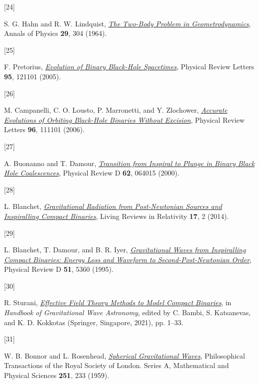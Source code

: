 \documentclass[
  11pt,
  a4paper,
  DIV=11,
  numbers=noendperiod,
  twoside]{scrreprt}
\newlength{\cslhangindent}
\newlength{\csllabelwidth}
\newlength{\cslentryspacingunit} %
\newenvironment{CSLReferences}[2] %
 {%
  \setlength{\parindent}{0pt}
  \ifodd #1
  \let\oldpar\par
  \def\par{\hangindent=\cslhangindent\oldpar}
  \fi
  \setlength{\parskip}{#2\cslentryspacingunit}
 }%
 {}
\newcommand{\CSLLeftMargin}[1]{\parbox[t]{\csllabelwidth}{#1}}
\newcommand{\CSLRightInline}[1]{\parbox[t]{\linewidth - \csllabelwidth}{#1}\break}
\DeclareRobustCommand{\[}{\begin{equation}}
\DeclareRobustCommand{\]}{\end{equation}}
\begin{document}
\begin{CSLReferences}{0}{0}
\leavevmode{}%
\CSLLeftMargin{{[}24{]} }%
\CSLRightInline{S. G. Hahn and R. W. Lindquist,
\emph{\href{https://doi.org/10.1016/0003-4916(64)90223-4}{The Two-Body
Problem in Geometrodynamics}}, Annals of Physics \textbf{29}, 304
(1964).}

\leavevmode{}%
\CSLLeftMargin{{[}25{]} }%
\CSLRightInline{F. Pretorius,
\emph{\href{https://doi.org/10.1103/PhysRevLett.95.121101}{Evolution of
{Binary Black-Hole Spacetimes}}}, Physical Review Letters \textbf{95},
121101 (2005).}

\leavevmode{}%
\CSLLeftMargin{{[}26{]} }%
\CSLRightInline{M. Campanelli, C. O. Lousto, P. Marronetti, and Y.
Zlochower,
\emph{\href{https://doi.org/10.1103/PhysRevLett.96.111101}{Accurate
{Evolutions} of {Orbiting Black-Hole Binaries} Without {Excision}}},
Physical Review Letters \textbf{96}, 111101 (2006).}

\leavevmode{}%
\CSLLeftMargin{{[}27{]} }%
\CSLRightInline{A. Buonanno and T. Damour,
\emph{\href{https://doi.org/10.1103/PhysRevD.62.064015}{Transition from
Inspiral to Plunge in Binary Black Hole Coalescences}}, Physical Review
D \textbf{62}, 064015 (2000).}

\leavevmode{}%
\CSLLeftMargin{{[}28{]} }%
\CSLRightInline{L. Blanchet,
\emph{\href{https://doi.org/10.12942/lrr-2014-2}{Gravitational
{Radiation} from {Post-Newtonian Sources} and {Inspiralling Compact
Binaries}}}, Living Reviews in Relativity \textbf{17}, 2 (2014).}

\leavevmode{}%
\CSLLeftMargin{{[}29{]} }%
\CSLRightInline{L. Blanchet, T. Damour, and B. R. Iyer,
\emph{\href{https://doi.org/10.1103/PhysRevD.51.5360}{Gravitational
Waves from Inspiralling Compact Binaries: {Energy} Loss and Waveform to
Second-Post-{Newtonian} Order}}, Physical Review D \textbf{51}, 5360
(1995).}

\leavevmode{}%
\CSLLeftMargin{{[}30{]} }%
\CSLRightInline{R. Sturani,
\emph{\href{https://doi.org/10.1007/978-981-15-4702-7_32-1}{Effective
{Field Theory Methods} to {Model Compact Binaries}}}, in \emph{Handbook
of {Gravitational Wave Astronomy}}, edited by C. Bambi, S. Katsanevas,
and K. D. Kokkotas ({Springer}, {Singapore}, 2021), pp. 1--33.}

\leavevmode{}%
\CSLLeftMargin{{[}31{]} }%
\CSLRightInline{W. B. Bonnor and L. Rosenhead,
\emph{\href{https://doi.org/10.1098/rsta.1959.0003}{Spherical
Gravitational Waves}}, Philosophical Transactions of the Royal Society
of London. Series A, Mathematical and Physical Sciences \textbf{251},
233 (1959).}


\end{CSLReferences}
\end{document}
